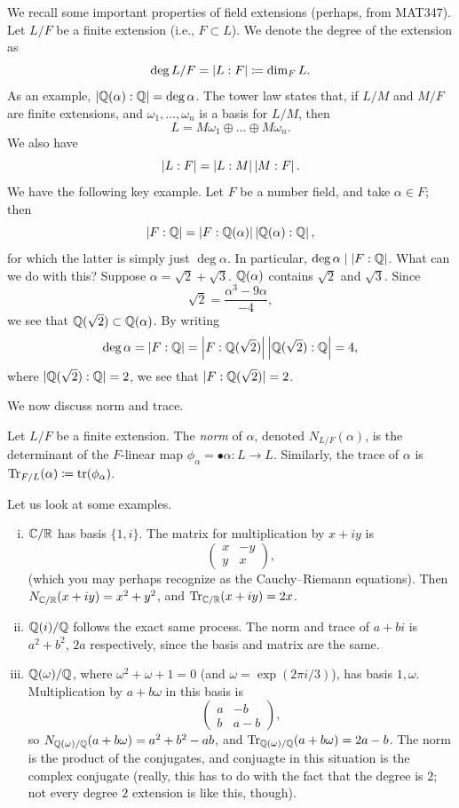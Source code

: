 We recall some important properties of field extensions (perhaps, from MAT347). Let $L/F$ be a finite extension (i.e., $F \subset L$). We denote the degree of the extension as
\[ \deg L/F = \left\lvert L : F \right\rvert \coloneq \dim_F L. \]
As an example, $\left\lvert \mathbb Q(\alpha) : \mathbb Q \right\rvert = \deg \alpha$. The tower law states that, if $L/M$ and $M/F$ are finite extensions, and $\omega_1, \dots, \omega_n$ is a basis for $L/M$, then
\[ L = M \omega_1 \oplus \dots \oplus M \omega_n. \]
We also have
\[ \left\lvert L : F \right\rvert = \left\lvert L : M \right\rvert \left\lvert M : F \right\rvert. \]
We have the following key example. Let $F$ be a number field, and take $\alpha \in F$; then
\[ \left\lvert F : \mathbb Q \right\rvert = \left\lvert F : \mathbb Q(\alpha) \right\rvert \left\lvert \mathbb Q(\alpha) : \mathbb Q \right\rvert, \]
for which the latter is simply just $\deg \alpha$. In particular, $\deg \alpha \mid \left\lvert F : \mathbb Q \right\rvert$. What can we do with this? Suppose $\alpha = \sqrt{2} + \sqrt{3}$. $\mathbb Q(\alpha)$ contains $\sqrt{2}$ and $\sqrt{3}$. Since
\[ \sqrt{2} = \frac{\alpha^3 - 9 \alpha}{-4}, \]
we see that $\mathbb Q(\sqrt{2}) \subset \mathbb Q(\alpha)$. By writing
\[ \deg \alpha = \left\lvert F : \mathbb Q \right\rvert = \left\lvert F : \mathbb Q(\sqrt{2}) \right\rvert \left\lvert \mathbb Q(\sqrt{2}) : \mathbb Q \right\rvert = 4, \]
where $\lvert \mathbb Q(\sqrt{2}) : \mathbb Q \rvert = 2$, we see that $\lvert F : \mathbb Q(\sqrt{2}) \rvert = 2$.

We now discuss norm and trace.
\begin{definition} \label{defn:norm_and_trace}
    Let $L/F$ be a finite extension. The \textit{norm} of $\alpha$, denoted $N_{L/F}(\alpha)$, is the determinant of the $F$-linear map $\phi_\alpha = \bullet \alpha \colon L \to L$. Similarly, the trace of $\alpha$ is $\operatorname{Tr}_{F/L}(\alpha) \coloneq \operatorname{tr}(\phi_\alpha)$.
\end{definition}

Let us look at some examples.
\begin{enumerate}[(i)]
    \item $\mathbb C/\mathbb R$ has basis $\{1, i\}$. The matrix for multiplication by $x + iy$ is
    \[ \begin{pmatrix} x & -y \\ y & x \end{pmatrix}, \]
    (which you may perhaps recognize as the Cauchy--Riemann equations). Then $N_{\mathbb C/\mathbb R}(x + iy) = x^2 + y^2$, and $\operatorname{Tr}_{\mathbb C/\mathbb R}(x + iy) = 2x$.

    \newpage
    \item $\mathbb Q(i)/\mathbb Q$ follows the exact same process. The norm and trace of $a + bi$ is $a^2 + b^2$, $2a$ respectively, since the basis and matrix are the same.
    
    \item $\mathbb Q(\omega)/\mathbb Q$, where $\omega^2 + \omega + 1 = 0$ (and $\omega = \exp(2\pi i / 3)$), has basis $1, \omega$. Multiplication by $a + b \omega$ in this basis is
    \[ \begin{pmatrix} a & -b \\ b & a - b \end{pmatrix}, \]
    so $N_{\mathbb Q(\omega)/\mathbb Q}(a + b\omega) = a^2 + b^2 - ab$, and $\operatorname{Tr}_{\mathbb Q(\omega)/\mathbb Q}(a + b \omega) = 2a - b$. The norm is the product of the conjugates, and conjuagte in this situation is the complex conjugate (really, this has to do with the fact that the degree is $2$; not every degree $2$ extension is like this, though).
\end{enumerate}

